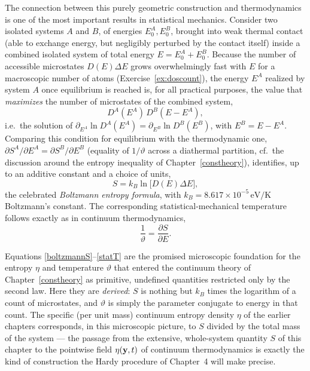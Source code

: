 The connection between this purely geometric construction and thermodynamics is one of the most important results in statistical mechanics. Consider two isolated systems $A$ and $B$, of energies $E^A_0,E^B_0$, brought into weak thermal contact (able to exchange energy, but negligibly perturbed by the contact itself) inside a combined isolated system of total energy $E=E^A_0+E^B_0$. Because the number of accessible microstates $D(E)\Delta E$ grows overwhelmingly fast with $E$ for a macroscopic number of atoms (Exercise~\ref{ex:doscount}), the energy $E^A$ realized by system $A$ once equilibrium is reached is, for all practical purposes, the value that \textit{maximizes} the number of microstates of the combined system,
\begin{equation}
	D^A(E^A)\,D^B(E-E^A),
\end{equation}
i.e.\ the solution of $\partial_{E^A}\ln D^A(E^A) = \partial_{E^B}\ln D^B(E^B)$, with $E^B=E-E^A$. Comparing this condition for equilibrium with the thermodynamic one, $\partial S^A/\partial E^A = \partial S^B/\partial E^B$ (equality of $1/\vartheta$ across a diathermal partition, cf.\ the discussion around the entropy inequality of Chapter~\ref{constheory}), identifies, up to an additive constant and a choice of units,
\begin{equation}\label{boltzmannS}
	S = k_B\ln\bigl[D(E)\Delta E\bigr],
\end{equation}
the celebrated \textit{Boltzmann entropy formula}, with $k_B=8.617\times10^{-5}\,\mathrm{eV/K}$ Boltzmann's constant. The corresponding statistical-mechanical temperature follows exactly as in continuum thermodynamics,
\begin{equation}\label{statT}
	\frac1\vartheta = \frac{\partial S}{\partial E}.
\end{equation}

\begin{remark}
	Equations \eqref{boltzmannS}--\eqref{statT} are the promised microscopic foundation for the entropy $\eta$ and temperature $\vartheta$ that entered the continuum theory of Chapter~\ref{constheory} as primitive, undefined quantities restricted only by the second law. Here they are \textit{derived}: $S$ is nothing but $k_B$ times the logarithm of a count of microstates, and $\vartheta$ is simply the parameter conjugate to energy in that count. The specific (per unit mass) continuum entropy density $\eta$ of the earlier chapters corresponds, in this microscopic picture, to $S$ divided by the total mass of the system --- the passage from the extensive, whole-system quantity $S$ of this chapter to the pointwise field $\eta(\mathbf{y},t)$ of continuum thermodynamics is exactly the kind of construction the Hardy procedure of Chapter~4 will make precise.
\end{remark}


